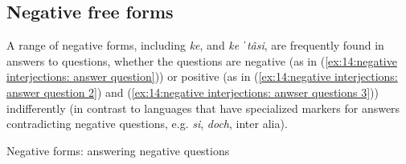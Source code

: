 


\subsection{Negative free forms}
\label{subsec: negative interjections}

A range of negative forms, including \textit{ke}, and \textit{ke ˈtâsi}, are frequently found in answers to questions, whether the questions are negative (as in (\ref{ex:14:negative interjections: answer question})) or positive (as in (\ref{ex:14:negative interjections: answer question 2}) and (\ref{ex:14:negative interjections: anwser questions 3})) indifferently (in contrast to languages that have specialized markers for answers contradicting negative questions, e.g.  \textit{si},  \textit{doch}, inter alia).

\newpage
\ea\label{ex:14:negative interjections: answer question}
{Negative forms: answering negative questions}

    \z
\z

